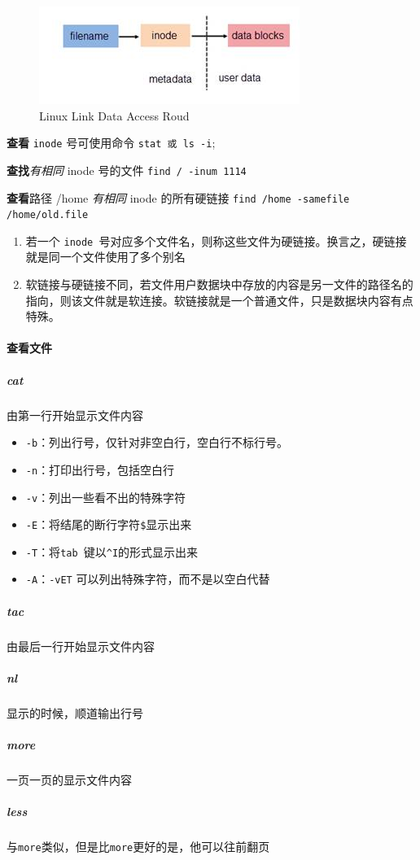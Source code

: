 \documentclass[UTF8,a4paper,12pt]{ctexbook}
\begin{document}
			\begin{figure}
				\centering
				\includegraphics[scale = 1.2]{Link.jpg}	
				\caption{Linux Link Data Access Roud}
				\label{Link}
			\end{figure}
			
			\textbf{查看} \verb|inode| 号可使用命令 \verb|stat 或 ls -i|;
			
			\textbf{查找}\textit{有相同} inode 号的文件 \verb|find / -inum 1114|
			
			\textbf{查看}路径 /home \textit{有相同} inode 的所有硬链接 \verb|find /home -samefile /home/old.file |
			
			\begin{enumerate}
				\item 若一个 \verb|inode |号对应多个文件名，则称这些文件为硬链接。换言之，硬链接就是同一个文件使用了多个别名
				
				\item 软链接与硬链接不同，若文件用户数据块中存放的内容是另一文件的路径名的指向，则该文件就是软连接。软链接就是一个普通文件，只是数据块内容有点特殊。
			\end{enumerate}
		\paragraph{查看文件}
			\subparagraph{cat} 由第一行开始显示文件内容
				\begin{itemize}[itemindent = 1em]
					\item \verb|-b|：列出行号，仅针对非空白行，空白行不标行号。
					\item \verb|-n|：打印出行号，包括空白行
					\item \verb|-v|：列出一些看不出的特殊字符
					\item \verb|-E|：将结尾的断行字符\verb|$|显示出来
					\item \verb|-T|：将\verb|tab |键以\verb|^I|的形式显示出来
					\item \verb|-A|：\verb|-vET| 可以列出特殊字符，而不是以空白代替
				\end{itemize}
			\subparagraph{tac} 由最后一行开始显示文件内容
			
			\subparagraph{nl} 显示的时候，顺道输出行号
			\subparagraph{more} 一页一页的显示文件内容
			\subparagraph{less} 与\verb|more|类似，但是比\verb|more|更好的是，他可以往前翻页
			
\end{document}
